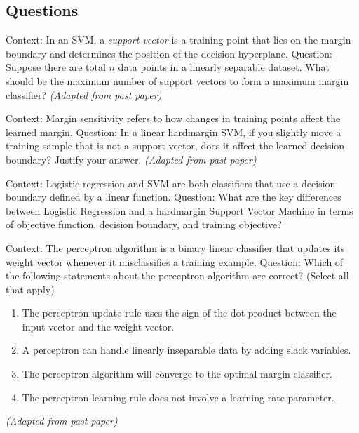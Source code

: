 \documentclass[12pt, a4paper]{article}
\begin{document}
\subsection*{Questions}

\begin{question}
Context: In an SVM, a \emph{support vector} is a training point that lies on the margin boundary and determines the position of the decision hyperplane.  
Question: Suppose there are total \(n\) data points in a linearly separable dataset. What should be the maximum number of support vectors to form a maximum margin classifier?  
\textit{(Adapted from past paper)}
\end{question}

\newpage

\begin{question}
Context: Margin sensitivity refers to how changes in training points affect the learned margin.  
Question: In a linear hardmargin SVM, if you slightly move a training sample that is not a support vector, does it affect the learned decision boundary? Justify your answer.  
\textit{(Adapted from past paper)}
\end{question}

\newpage

\begin{question}
Context: Logistic regression and SVM are both classifiers that use a decision boundary defined by a linear function.  
Question: What are the key differences between Logistic Regression and a hardmargin Support Vector Machine in terms of objective function, decision boundary, and training objective?  
\end{question}

\newpage

\begin{question}
Context: The perceptron algorithm is a binary linear classifier that updates its weight vector whenever it misclassifies a training example.  
Question: Which of the following statements about the perceptron algorithm are correct? (Select all that apply)  
\begin{enumerate}
  \item The perceptron update rule uses the sign of the dot product between the input vector and the weight vector.  
  \item A perceptron can handle linearly inseparable data by adding slack variables.  
  \item The perceptron algorithm will converge to the optimal margin classifier.  
  \item The perceptron learning rule does not involve a learning rate parameter.  
\end{enumerate}
\textit{(Adapted from past paper)}
\end{question}
\end{document}

